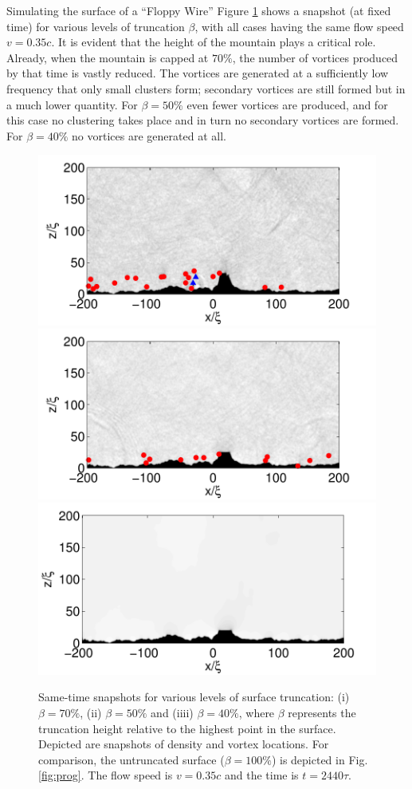 \begin{chapter}{\label{cha:afm}Simulating the surface of a ``Floppy Wire''}
Figure \ref{fig:trunc} shows a snapshot (at fixed time) for various levels of truncation $\beta$, with all cases having the same flow speed $v=0.35c$.  It is evident that the height of the mountain plays a critical role.  Already, when the mountain is capped at $70\%$, the number of vortices produced by that time is vastly reduced.  The vortices are generated at a sufficiently low frequency that only small clusters form; secondary vortices are still formed but in a much lower quantity.  For $\beta=50\%$ even fewer vortices are produced, and for this case no clustering takes place and in turn no secondary vortices are formed.  For $\beta=40\%$ no vortices are generated at all. 
\begin{figure}
\includegraphics[width=0.35\linewidth]{./afm/figures/6th-35-2440}\hspace{-0.6cm}
\includegraphics[width=0.35\linewidth]{./afm/figures/8th-35-2440}\hspace{-0.6cm}
\includegraphics[width=0.35\linewidth]{./afm/figures/10th-35-2440}
\caption{\label{fig:trunc} Same-time snapshots for various levels of surface truncation: (i) $\beta=70\%$, (ii) $\beta=50\%$ and (iiii) $\beta=40\%$, where $\beta$ represents the truncation height relative to the highest point in the surface. Depicted are snapshots of density and vortex locations. For comparison, the untruncated surface ($\beta=100\%$) is depicted in Fig. \ref{fig:prog}.  The flow speed is $v=0.35c$ and the time is $t=2440\tau$.}
\end{figure}
 

\end{chapter}
